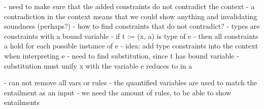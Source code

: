 \quad\\\\\\\\\\
- need to make sure that the added constraints do not contradict the context
  - a contradiction in the context means that we could show anything and invalidating soundness (perhaps?)
- how to find constraints that do not contradict?
- types are constraints with a bound variable
- if t := (x, a) is type of e
  - then all constraints a hold for each possible instance of e
- idea: add type constraints into the context when interpreting e
- need to find substitution, since t has bound variable
  - substitution must unify x with the variable e reduces to in a

- can not remove all vars or rules
- the quantified variables are used to match the entailment as an input
- we need the amount of rules, to be able to show entailments

